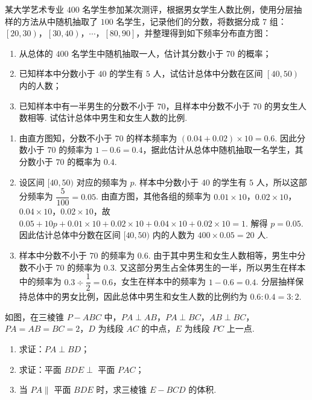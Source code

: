 \begin{problem}

某大学艺术专业 \(400\) 名学生参加某次测评，根据男女学生人数比例，使用分层抽样的方法从中随机抽取了 \(100\) 名学生，记录他们的分数，将数据分成 \(7\) 组：\(\left[20,30\right)\)，\(\left[30,40\right)\)，\(\cdots\)，\(\left[80,90\right]\)，并整理得到如下频率分布直方图：

\begin{enumerate}
\item 从总体的 \(400\) 名学生中随机抽取一人，估计其分数小于 \(70\) 的概率；
\item 已知样本中分数小于 \(40\) 的学生有 \(5\) 人，试估计总体中分数在区间 \(\left[40,50\right)\) 内的人数；
\item 已知样本中有一半男生的分数不小于 \(70\)，且样本中分数不小于 \(70\) 的男女生人数相等. 试估计总体中男生和女生人数的比例.
\end{enumerate}

\end{problem}

\begin{solution}
\begin{enumerate}
\item 由直方图知，分数不小于 \(70\) 的样本频率为 \((0.04+0.02)\times10=0.6\). 因此分数小于 \(70\) 的频率为 \(1-0.6=0.4\)，据此估计从总体中随机抽取一名学生，其分数小于 \(70\) 的概率为 \(0.4\).
\item 设区间 \([40,50)\) 对应的频率为 \(p\). 样本中分数小于 \(40\) 的学生有 \(5\) 人，所以这部分频率为 \(\dfrac5{100}=0.05\). 由直方图，其他各组的频率为 \(0.01\times10\)，\(0.02\times10\)，\(0.04\times10\)，\(0.02\times10\)，故
\(0.05+10p+0.01\times10+0.02\times10+0.04\times10+0.02\times10=1\).
解得 \(p=0.05\). 因此估计总体中分数在区间 \([40,50)\) 内的人数为 \(400\times0.05=20\) 人.
\item 样本中分数不小于 \(70\) 的频率为 \(0.6\). 由于其中男生和女生人数相等，男生中分数不小于 \(70\) 的频率为 \(0.3\). 又这部分男生占全体男生的一半，所以男生在样本中的频率为 \(0.3\div\dfrac12=0.6\)，女生在样本中的频率为 \(1-0.6=0.4\). 分层抽样保持总体中的男女比例，因此总体中男生和女生人数的比例约为 \(0.6:0.4=3:2\).
\end{enumerate}
\end{solution}

\begin{problem}

如图，在三棱锥 \(P-ABC\) 中，\(PA\perp AB\)，\(PA\perp BC\)，\(AB\perp BC\)，\(PA=AB=BC=2\)，\(D\) 为线段 \(AC\) 的中点，\(E\) 为线段 \(PC\) 上一点.

\begin{enumerate}
\item 求证：\(PA\perp BD\)；
\item 求证：平面 \(BDE\perp\) 平面 \(PAC\)；
\item 当 \(PA\parallel\) 平面 \(BDE\) 时，求三棱锥 \(E-BCD\) 的体积.
\end{enumerate}

\end{problem}


